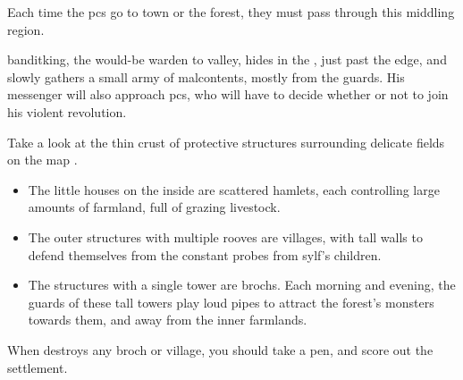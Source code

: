 \begin{multicols}{2}


\end{multicols}

\label{sqList}

\begin{multicols}{2}
\noindent
Each time the \glspl{pc} go to \gls{town} or the forest, they must pass through this middling \gls{region}.

\Gls{banditking}, the would-be \gls{warden} to \gls{valley}, hides in the , just past the \gls{edge}, and slowly gathers a small army of malcontents, mostly from the \glspl{guard}.
His messenger will also approach \glspl{pc}, who will have to decide whether or not to join his violent revolution.

Take a look at the thin crust of protective structures surrounding delicate fields on the map .

\begin{itemize}
  \item
  The little houses on the inside are scattered hamlets, each controlling large amounts of farmland, full of grazing livestock.
  \item
  The outer structures with multiple rooves are \glspl{village}, with tall walls to defend themselves from the constant probes from \gls{sylf}'s children.
  \item
  The structures with a single tower are \glspl{broch}.
  Each morning and evening, the \glspl{guard} of these tall towers play loud pipes to attract the forest's \glspl{monster} towards them, and away from the inner farmlands.
\end{itemize}

When  destroys any \gls{broch} or \gls{village}, you should take a pen, and score out the settlement.

\end{multicols}



